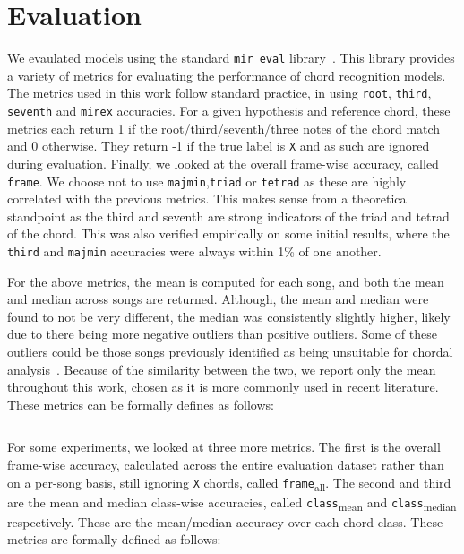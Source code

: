 \section{Evaluation}

We evaulated models using the standard \texttt{mir\_eval} library~\citep{mir_eval}. This library provides a variety of metrics for evaluating the performance of chord recognition models. The metrics used in this work follow standard practice, in using \texttt{root}, \texttt{third}, \texttt{seventh} and \texttt{mirex} accuracies. For a given hypothesis and reference chord, these metrics each return 1 if the root/third/seventh/three notes of the chord match and 0 otherwise. They return -1 if the true label is \texttt{X} and as such are ignored during evaluation. Finally, we looked at the overall frame-wise accuracy, called \texttt{frame}. We choose not to use \texttt{majmin},\texttt{triad} or \texttt{tetrad} as these are highly correlated with the previous metrics. This makes sense from a theoretical standpoint as the third and seventh are strong indicators of the triad and tetrad of the chord. This was also verified empirically on some initial results, where the \texttt{third} and \texttt{majmin} accuracies were always within 1\% of one another.

For the above metrics, the mean is computed for each song, and both the mean and median across songs are returned. Although, the mean and median were found to not be very different, the median was consistently slightly higher, likely due to there being more negative outliers than positive outliers. Some of these outliers could be those songs previously identified as being unsuitable for chordal analysis~\citep{FourTimelyInsights}. Because of the similarity between the two, we report only the mean throughout this work, chosen as it is more commonly used in recent literature. These metrics can be formally defines as follows:

\[\]

For some experiments, we looked at three more metrics. The first is the overall frame-wise accuracy, calculated across the entire evaluation dataset rather than on a per-song basis, still ignoring \texttt{X} chords, called \texttt{frame}\textsubscript{all}. The second and third are the mean and median class-wise accuracies, called \texttt{class}\textsubscript{mean} and \texttt{class}\textsubscript{median} respectively. These are the mean/median accuracy over each chord class. These metrics are formally defined as follows:

